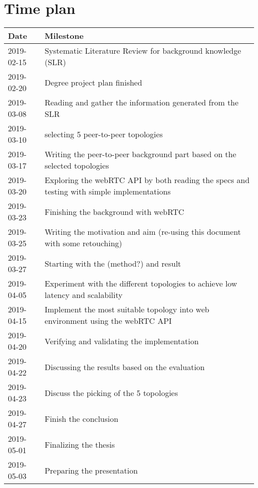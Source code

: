 \documentclass[12pt]{article}
\begin{document}
\section*{Time plan}
\begin{tabular} {|p{2.6cm}|p{10.2cm}|} \hline
\textbf{Date} & \textbf{Milestone} \\ \hline
2019-02-15 & Systematic Literature Review for background knowledge (SLR)\\ \hline
2019-02-20 & Degree project plan finished \\ \hline
2019-03-08 & Reading and gather the information generated from the SLR \\ \hline
2019-03-10 & selecting 5 peer-to-peer topologies \\ \hline
2019-03-17 & Writing the peer-to-peer background part based on the selected topologies \\ \hline
2019-03-20 & Exploring the webRTC API by both reading the specs and testing with simple implementations  \\ \hline
2019-03-23 & Finishing the background with webRTC \\ \hline
2019-03-25 & Writing the motivation and aim (re-using this document with some retouching) \\ \hline
2019-03-27 & Starting with the (method?) and result \\ \hline
2019-04-05 & Experiment with the different topologies to achieve low latency and scalability \\ \hline
2019-04-15 & Implement the most suitable topology into web environment using the webRTC API \\ \hline
2019-04-20 & Verifying and validating the implementation  \\ \hline
2019-04-22 & Discussing the results based on the evaluation  \\ \hline
2019-04-23 & Discuss the picking of the 5 topologies \\ \hline
2019-04-27 & Finish the conclusion \\ \hline
2019-05-01 & Finalizing the thesis  \\ \hline
2019-05-03 & Preparing the presentation \\ \hline
\end{tabular}

\pagebreak


\end{document}
